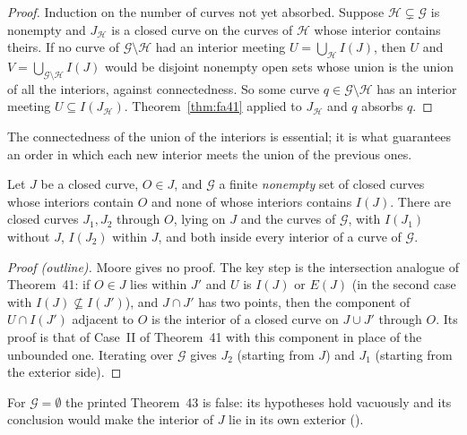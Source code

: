 \begin{proof}
Induction on the number of curves not yet absorbed. Suppose $\mathcal H\subsetneq\mathcal G$ is nonempty and $J_{\mathcal H}$ is a closed
curve on the curves of $\mathcal H$ whose interior contains theirs. If no curve of $\mathcal G\setminus\mathcal H$ had an interior meeting
$U=\bigcup_{\mathcal H}I(J)$, then $U$ and $V=\bigcup_{\mathcal G\setminus\mathcal H}I(J)$ would be disjoint nonempty open sets whose union
is the union of all the interiors, against connectedness. So some curve $q\in\mathcal G\setminus\mathcal H$ has an interior meeting
$U\subseteq I(J_{\mathcal H})$. Theorem~\ref{thm:fa41}
applied to $J_{\mathcal H}$ and $q$ absorbs $q$.
\end{proof}


The connectedness of the union of the interiors is essential; it is what guarantees an order in which each new interior meets the union
of the previous ones.

\begin{theorem}\label{thm:fa43}
Let $J$ be a closed curve, $O\in J$, and $\mathcal G$ a finite \emph{nonempty} set of closed curves whose interiors contain $O$ and none
of whose interiors contains $I(J)$. There are closed curves $J_1,J_2$ through $O$, lying on $J$ and the curves of $\mathcal G$, with $I(J_1)$
without $J$, $I(J_2)$ within $J$, and both inside every interior of a curve of $\mathcal G$.
\end{theorem}

\begin{proof}[Proof (outline)]
Moore gives no proof. The key step is the intersection analogue of Theorem~41: if $O\in J$ lies within $J'$ and $U$ is $I(J)$ or $E(J)$
(in the second case with $I(J)\not\subseteq I(J')$), and $J\cap J'$ has two points, then the component of $U\cap I(J')$ adjacent to $O$ is
the interior of a closed curve on $J\cup J'$ through $O$. Its proof is that of Case~II of Theorem~41 with this component in place of the
unbounded one. Iterating over $\mathcal G$ gives $J_2$ (starting from $J$) and $J_1$ (starting from the exterior side).
\end{proof}


For $\mathcal G=\emptyset$ the printed Theorem~43 is false: its hypotheses hold vacuously and its conclusion would make the interior of $J$
lie in its own exterior ().

